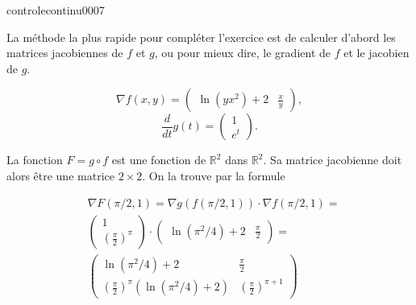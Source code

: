 \begin{corrige}{controlecontinu0007}

La méthode la plus rapide pour compléter l'exercice est de calculer d'abord  les matrices jacobiennes de $f$ et $g$, ou pour mieux dire, le gradient de $f$ et le jacobien de $g$. 

\begin{equation}
  \nabla f(x,y) = 
  \begin{pmatrix}
    \ln(yx^2)+ 2 & \frac{x}{y}
  \end{pmatrix},
\end{equation}
\begin{equation}
  \frac{d }{dt} g(t)=
  \begin{pmatrix}
    1\\ e^t
  \end{pmatrix}. 
\end{equation}

La fonction $F=g\circ f$ est une fonction de $\mathbb{R}^2$ dans $\mathbb{R}^2$. Sa matrice jacobienne doit alors être une matrice $2\times 2$. On la trouve par la formule

\begin{equation}
  \begin{aligned}
    &\nabla F(\pi/2, 1)= \nabla g(f(\pi/2, 1))\cdot \nabla f(\pi/2, 1) =  \\
    &\begin{pmatrix}
      1\\ \left(\frac{\pi}{2}\right)^\pi
    \end{pmatrix}\cdot \begin{pmatrix}
    \ln(\pi^2/4)+ 2 & \frac{\pi}{2}
  \end{pmatrix}=\\
    &
    \begin{pmatrix}
      \ln(\pi^2/4)+ 2 & \frac{\pi}{2}\\
     \left(\frac{\pi}{2}\right)^\pi (\ln(\pi^2/4)+ 2) & \left(\frac{\pi}{2}\right)^{\pi+1}
    \end{pmatrix}
  \end{aligned}
\end{equation}

\end{corrige}


